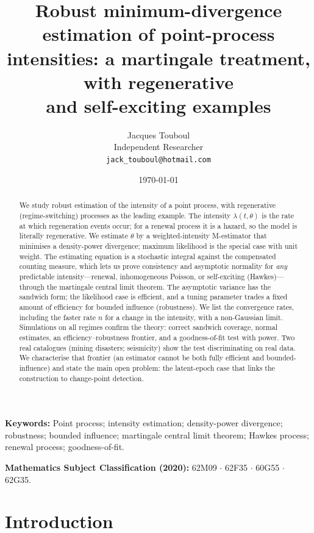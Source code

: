 \documentclass[11pt]{article}
\title{\bf Robust minimum-divergence estimation of point-process\\
intensities: a martingale treatment, with regenerative\\
and self-exciting examples}
\author{Jacques Touboul\\ \normalsize Independent Researcher \\ \normalsize\texttt{jack\_touboul@hotmail.com}}
\date{\today}
\begin{document}
\maketitle

\begin{abstract}
We study robust estimation of the intensity of a point process, with regenerative
(regime-switching) processes as the leading example. The intensity
$\lambda(t,\theta)$ is the rate at which regeneration events occur; for a renewal
process it is a hazard, so the model is literally regenerative. We estimate
$\theta$ by a weighted-intensity M-estimator that minimises a density-power
divergence; maximum likelihood is the special case with unit weight. The
estimating equation is a stochastic integral against the compensated counting
measure, which lets us prove consistency and asymptotic normality for \emph{any}
predictable intensity---renewal, inhomogeneous Poisson, or self-exciting
(Hawkes)---through the martingale central limit theorem. The asymptotic variance
has the sandwich form; the likelihood case is efficient, and a tuning parameter
trades a fixed amount of efficiency for bounded influence (robustness). We list
the convergence rates, including the faster rate $n$ for a change in the intensity,
with a non-Gaussian limit. Simulations on all regimes confirm the theory:
correct sandwich coverage, normal estimates, an efficiency--robustness frontier,
and a goodness-of-fit test with power. Two real catalogues (mining disasters;
seismicity) show the test discriminating on real data. We characterise that frontier (an estimator
cannot be both fully efficient and bounded-influence) and state the main open
problem: the latent-epoch case that links the construction to change-point
detection.
\end{abstract}

\noindent\textbf{Keywords:} Point process; intensity estimation; density-power
divergence; robustness; bounded influence; martingale central limit theorem;
Hawkes process; renewal process; goodness-of-fit.

\smallskip
\noindent\textbf{Mathematics Subject Classification (2020):}
62M09 $\cdot$ 62F35 $\cdot$ 60G55 $\cdot$ 62G35.

\section{Introduction}
\label{sec:intro}
\end{document}

